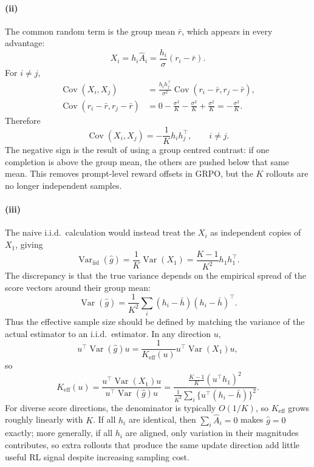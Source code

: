 \documentclass[11pt,a4paper]{article}
\begin{document}
\paragraph{(ii)}
The common random term is the group mean $\bar r$, which appears in every advantage:
\[
    X_i=h_i\hat A_i=\frac{h_i}{\sigma}(r_i-\bar r).
\]
For $i\ne j$,
\begin{align*}
    \operatorname{Cov}(X_i,X_j)
    &=\frac{h_i h_j^\top}{\sigma^2}
      \operatorname{Cov}(r_i-\bar r,r_j-\bar r),\\
    \operatorname{Cov}(r_i-\bar r,r_j-\bar r)
    &=0-\frac{\sigma^2}{K}-\frac{\sigma^2}{K}
      +\frac{\sigma^2}{K}
      =-\frac{\sigma^2}{K}.
\end{align*}
Therefore
\[
    \boxed{
        \operatorname{Cov}(X_i,X_j)=-\frac{1}{K}h_i h_j^\top,
        \qquad i\ne j.
    }
\]
The negative sign is the result of using a group centred contrast: if one completion is above the group mean, the others are pushed below that same mean.  This removes prompt-level reward offsets in GRPO, but the $K$ rollouts are no longer independent samples.

\paragraph{(iii)}
The naive i.i.d.\ calculation would instead treat the \(X_i\) as independent copies of \(X_1\), giving
\[
    \operatorname{Var}_{\mathrm{iid}}(\hat g)
    =
    \frac{1}{K}\operatorname{Var}(X_1)
    =
    \frac{K-1}{K^2}h_1h_1^\top .
\]
The discrepancy is that the true variance depends on the empirical spread of the score vectors around their group mean:
\[
    \operatorname{Var}(\hat g)
    =
    \frac{1}{K^2}\sum_i(h_i-\bar h)(h_i-\bar h)^\top .
\]
Thus the effective sample size should be defined by matching the variance of the actual estimator to an i.i.d.\ estimator.  In any direction \(u\),
\[
    u^\top \operatorname{Var}(\hat g)u
    =
    \frac{1}{K_{\mathrm{eff}}(u)}
    u^\top\operatorname{Var}(X_1)u,
\]
so
\[
    \boxed{
    K_{\mathrm{eff}}(u)
    =
    \frac{u^\top\operatorname{Var}(X_1)u}
         {u^\top\operatorname{Var}(\hat g)u}
    =
    \frac{\frac{K-1}{K}(u^\top h_1)^2}
         {\frac{1}{K^2}\sum_i\{u^\top(h_i-\bar h)\}^2}.
    }
\]
For diverse score directions, the denominator is typically \(O(1/K)\), so \(K_{\mathrm{eff}}\) grows roughly linearly with \(K\).  If all \(h_i\) are identical, then \(\sum_i \hat A_i=0\) makes \(\hat g=0\) exactly; more generally, if all \(h_i\) are aligned, only variation in their magnitudes contributes, so extra rollouts that produce the same update direction add little useful RL signal despite increasing sampling cost. 
\end{document}

